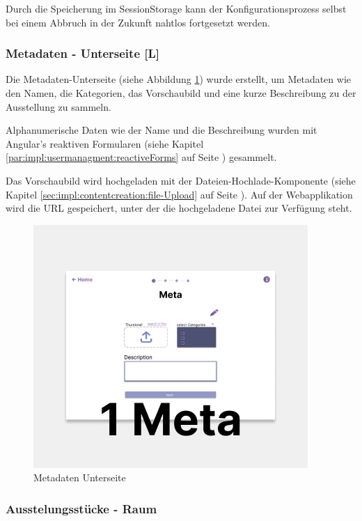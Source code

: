 Durch die Speicherung im SessionStorage kann der Konfigurationsprozess selbst bei einem Abbruch in der Zukunft nahtlos fortgesetzt werden.

\subsubsection{Metadaten - Unterseite [L]}
Die Metadaten-Unterseite (siehe Abbildung \ref{fig:impl:creation:Metadaten_Unterseite}) wurde erstellt, um Metadaten wie den Namen, die Kategorien, das Vorschaubild und eine kurze Beschreibung zu der Ausstellung zu sammeln.

Alphanumerische Daten wie der Name und die Beschreibung wurden mit Angular's reaktiven Formularen (siehe Kapitel \ref{par:impl:usermanagment:reactiveForms} auf Seite \pageref{par:impl:usermanagment:reactiveForms}) gesammelt.

Das Vorschaubild wird hochgeladen mit der Dateien-Hochlade-Komponente (siehe Kapitel \ref{sec:impl:contentcreation:file-Upload} auf Seite \pageref{sec:impl:contentcreation:file-Upload}). Auf der Webapplikation wird die URL gespeichert, unter der die hochgeladene Datei zur Verfügung steht.

\begin{figure}
    \centering
    \includegraphics[scale=0.5]{pics/metadaten.png}
    \caption{Metadaten Unterseite}
    \label{fig:impl:creation:Metadaten_Unterseite}
\end{figure}

\subsubsection{Ausstelungsstücke - Raum}
